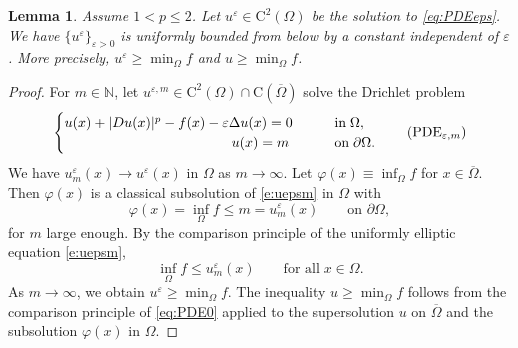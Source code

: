 \documentclass[12pt,reqno]{amsart}
\numberwithin{figure}{section}
\theoremstyle{plain}
\newtheorem{lem}[thm]{Lemma}
\theoremstyle{remark}
\numberwithin{equation}{section}
\newcommand{\rmC}{\mathrm{C}}
\begin{document}
\begin{lem}\label{lem:lower-bound} Assume $1<p\leq 2$. Let $u^\varepsilon\in \mathrm{C}^2(\Omega)$ be the solution to \eqref{eq:PDEeps}. We have $\{  u^\varepsilon\}_{\varepsilon>0}$ is uniformly bounded from below by a constant independent of $\varepsilon$. More precisely, $  u^\varepsilon \geq \min_\Omega f$ and $  u\geq \min_\Omega f$.
\end{lem}
\begin{proof} For $m\in \mathbb{N}$, let $u^{\varepsilon,m}\in \mathrm{C}^2(\Omega)\cap \rmC(\overline{\Omega})$ solve the Drichlet problem
\begin{equation}\label{e:uepsm}
    \begin{cases}
      u(x) + |Du(x)|^p - f(x) - \varepsilon \Delta u(x) = 0 &\qquad
    \text{in}\;\Omega, \vspace{0cm}\\
    \quad \qquad\quad\qquad\qquad\qquad\qquad u(x) = m &\qquad
    \text{on}\;\partial\Omega.
    \end{cases} \tag{PDE$_{\varepsilon,m}$}
\end{equation}
We have $u^{\varepsilon}_m(x) \to u^\varepsilon(x)$ in $\Omega$ as $m\to \infty$. Let $\varphi(x) \equiv  \inf_{\Omega} f$ for $x\in \overline{\Omega}$. Then $\varphi(x)$ is a classical subsolution of \eqref{e:uepsm} in $\Omega$ with
\begin{equation*}
    \varphi(x) =   \inf_\Omega f \leq m = u^\varepsilon_m(x) \qquad \text{on } \partial \Omega,
\end{equation*}
for $m$ large enough.
By the comparison principle of the uniformly elliptic equation \eqref{e:uepsm},
\begin{equation*}
     \inf_\Omega f \leq u^{\varepsilon}_m(x) \qquad\text{for all}\;x\in \Omega.
\end{equation*}
As $m\to \infty$, we obtain $  u^\varepsilon \geq \min_\Omega f$. The inequality $  u\geq \min_{\Omega}f$ follows from the comparison principle of \eqref{eq:PDE0} applied to the supersolution $u$ on $\overline{\Omega}$ and the subsolution $\varphi(x)$ in $\Omega$.
\end{proof}
\end{document}
